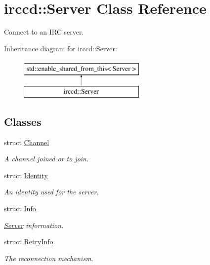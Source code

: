 \hypertarget{a00055}{\section{irccd\-:\-:Server Class Reference}
\label{a00055}
}


Connect to an I\-R\-C server.  


Inheritance diagram for irccd\-:\-:Server\-:\begin{figure}[H]
\begin{center}
\leavevmode
\includegraphics[height=2.000000cm]{a00055}
\end{center}
\end{figure}
\subsection*{Classes}
\begin{DoxyCompactItemize}
\item 
struct \hyperlink{a00004}{Channel}
\begin{DoxyCompactList}\small\item\em A channel joined or to join. \end{DoxyCompactList}\item 
struct \hyperlink{a00029}{Identity}
\begin{DoxyCompactList}\small\item\em An identity used for the server. \end{DoxyCompactList}\item 
struct \hyperlink{a00031}{Info}
\begin{DoxyCompactList}\small\item\em \hyperlink{a00055}{Server} information. \end{DoxyCompactList}\item 
struct \hyperlink{a00053}{Retry\-Info}
\begin{DoxyCompactList}\small\item\em The reconnection mechanism. \end{DoxyCompactList}\end{DoxyCompactItemize}
